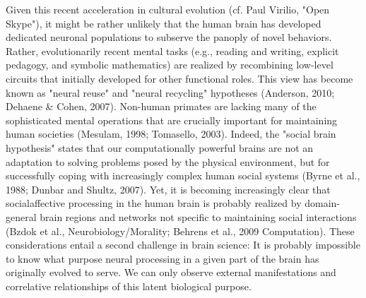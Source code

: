 \documentclass[authoryear,review,3p]{elsarticle}
\begin{document}
Given this recent acceleration in cultural evolution
(cf. Paul Virilio, "Open Skype"),
it might be
rather unlikely that the human brain has developed dedicated
neuronal populations to subserve the panoply of novel behaviors.
Rather, evolutionarily recent mental tasks
(e.g., reading and writing, explicit pedagogy, and
symbolic mathematics)
are realized by recombining low-level circuits that initially
developed for other functional roles.
This view has become known as
"neural reuse" and "neural recycling" hypotheses
(Anderson, 2010; Dehaene \& Cohen, 2007).
Non-human primates are lacking many of the sophisticated
mental operations that
are crucially important for maintaining human societies
(Mesulam, 1998; Tomasello, 2003).
Indeed,
the "social brain hypothesis" states that our
computationally powerful brains are not an adaptation to
solving problems posed by the physical environment,
but for successfully coping with increasingly complex human social systems
(Byrne et al., 1988; Dunbar and Shultz, 2007).
Yet, it is becoming increasingly clear that socialaffective processing
in the human brain is probably realized by domain-general
brain regions and networks not specific to maintaining social interactions
(Bzdok et al., Neurobiology/Morality; Behrens et al., 2009 Computation).
These considerations entail a second challenge in brain science:
It is probably impossible to know what purpose neural
processing in a given part of the brain has originally evolved to serve.
We can only observe external manifestations and correlative relationships of
this latent biological purpose.
\end{document}
